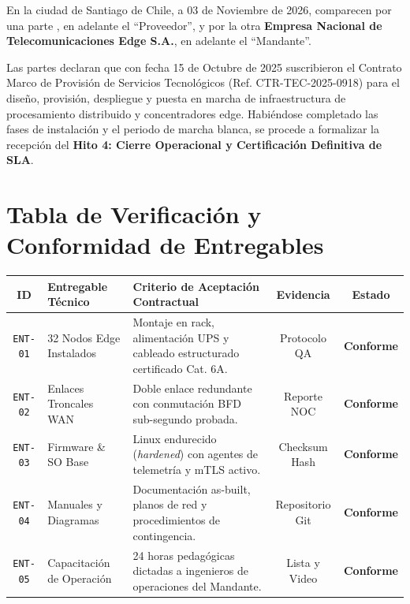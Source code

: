 \documentclass[11pt,letterpaper]{article}
\begin{document}
En la ciudad de Santiago de Chile, a 03 de Noviembre de 2026, comparecen por una parte \textbf{\corporatebrandlegal}, en adelante el ``Proveedor'', y por la otra \textbf{Empresa Nacional de Telecomunicaciones Edge S.A.}, en adelante el ``Mandante''.

Las partes declaran que con fecha 15 de Octubre de 2025 suscribieron el Contrato Marco de Provisi\'on de Servicios Tecnol\'ogicos (Ref. CTR-TEC-2025-0918) para el dise\~no, provisi\'on, despliegue y puesta en marcha de infraestructura de procesamiento distribuido y concentradores edge. Habi\'endose completado las fases de instalaci\'on y el periodo de marcha blanca, se procede a formalizar la recepci\'on del \textbf{Hito 4: Cierre Operacional y Certificaci\'on Definitiva de SLA}.

\vspace{0.4em}

\section{Tabla de Verificaci\'on y Conformidad de Entregables}

\noindent
\begin{tabularx}{\linewidth}{@{}c p{3.2cm} X c c@{}}
  \toprule
  \textbf{\color{corpPrimary}ID} & \textbf{\color{corpPrimary}Entregable T\'ecnico} & \textbf{\color{corpPrimary}Criterio de Aceptaci\'on Contractual} & \textbf{\color{corpPrimary}Evidencia} & \textbf{\color{corpPrimary}Estado} \\
  \midrule
  \texttt{ENT-01} & 32 Nodos Edge Instalados & Montaje en rack, alimentaci\'on UPS y cableado estructurado certificado Cat. 6A. & Protocolo QA & \textbf{\color{corpSuccess}Conforme} \\
  \addlinespace[2pt]
  \texttt{ENT-02} & Enlaces Troncales WAN & Doble enlace redundante con conmutaci\'on BFD sub-segundo probada. & Reporte NOC & \textbf{\color{corpSuccess}Conforme} \\
  \addlinespace[2pt]
  \texttt{ENT-03} & Firmware \& SO Base & Linux endurecido (\textit{hardened}) con agentes de telemetr\'ia y mTLS activo. & Checksum Hash & \textbf{\color{corpSuccess}Conforme} \\
  \addlinespace[2pt]
  \texttt{ENT-04} & Manuales y Diagramas & Documentaci\'on as-built, planos de red y procedimientos de contingencia. & Repositorio Git & \textbf{\color{corpSuccess}Conforme} \\
  \addlinespace[2pt]
  \texttt{ENT-05} & Capacitaci\'on de Operaci\'on & 24 horas pedag\'ogicas dictadas a ingenieros de operaciones del Mandante. & Lista y Video & \textbf{\color{corpSuccess}Conforme} \\
  \bottomrule
\end{tabularx}
\end{document}
